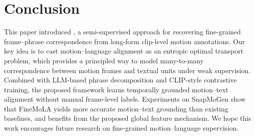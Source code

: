\vspace{3mm}
\section{Conclusion}
This paper introduced \ours, a semi-supervised approach for recovering fine-grained frame--phrase correspondence from long-form clip-level motion annotations. Our key idea is to cast motion--language alignment as an entropic optimal transport problem, which provides a principled way to model many-to-many correspondence between motion frames and textual units under weak supervision. Combined with LLM-based phrase decomposition and CLIP-style contrastive training, the proposed framework learns temporally grounded motion--text alignment without manual frame-level labels. Experiments on SnapMoGen show that FineMoLA yields more accurate motion--text grounding than existing baselines, and benefits from the proposed global feature mechanism. We hope this work encourages future research on fine-grained motion--language supervision.